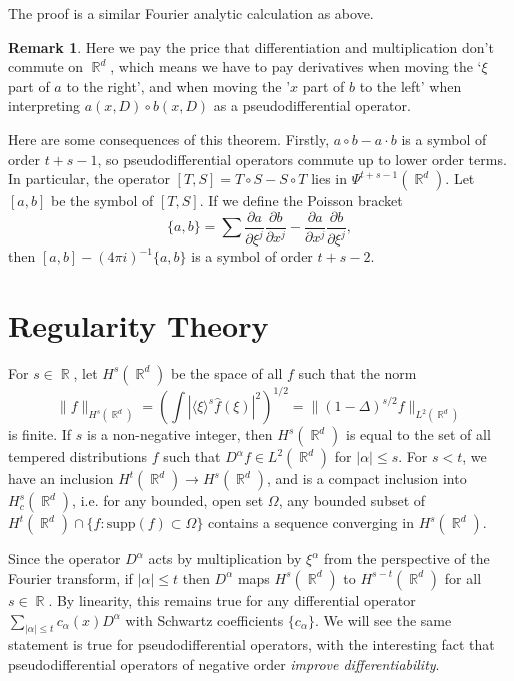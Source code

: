 \documentclass{article}
\DeclareMathOperator{\RR}{\mathbb{R}}
\theoremstyle{plain}
\theoremstyle{definition}
\newtheorem*{remark}{Remark}
\begin{document}
The proof is a similar Fourier analytic calculation as above.

\begin{remark}
    Here we pay the price that differentiation and multiplication don't commute on $\RR^d$, which means we have to pay derivatives when moving the `$\xi$ part of $a$ to the right', and when moving the '$x$ part of $b$ to the left' when interpreting $a(x,D) \circ b(x,D)$ as a pseudodifferential operator.
\end{remark}

Here are some consequences of this theorem. Firstly, $a \circ b - a \cdot b$ is a symbol of order $t + s -1$, so pseudodifferential operators commute up to lower order terms. In particular, the operator $[T,S] = T \circ S - S \circ T$ lies in $\Psi^{t + s - 1}(\RR^d)$. Let $[a,b]$ be the symbol of $[T,S]$. If we define the Poisson bracket
%
\[ \{ a, b \} = \sum \frac{\partial a}{\partial \xi^j} \frac{\partial b}{\partial x^j} - \frac{\partial a}{\partial x^j} \frac{\partial b}{\partial \xi^j}, \]
%
then $[a,b] - (4 \pi i)^{-1} \{ a, b \}$ is a symbol of order $t + s - 2$.

\section{Regularity Theory}

For $s \in \RR$, let $H^s(\RR^d)$ be the space of all $f$ such that the norm
%
\[ \| f \|_{H^s(\RR^d)} = \left( \int | \langle \xi \rangle^s \widehat{f}(\xi)|^2 \right)^{1/2} = \| (1 - \Delta)^{s/2} f \|_{L^2(\RR^d)} \]
%
is finite. If $s$ is a non-negative integer, then $H^s(\RR^d)$ is equal to the set of all tempered distributions $f$ such that $D^\alpha f \in L^2(\RR^d)$ for $|\alpha| \leq s$. For $s < t$, we have an inclusion $H^t(\RR^d) \to H^s(\RR^d)$, and is a compact inclusion into $H^s_c(\RR^d)$, i.e. for any bounded, open set $\Omega$, any bounded subset of $H^t(\RR^d) \cap \{ f : \text{supp}(f) \subset \Omega \}$ contains a sequence converging in $H^s(\RR^d)$.

Since the operator $D^\alpha$ acts by multiplication by $\xi^\alpha$ from the perspective of the Fourier transform, if $|\alpha| \leq t$ then $D^\alpha$ maps $H^s(\RR^d)$ to $H^{s - t}(\RR^d)$ for all $s \in \RR$. By linearity, this remains true for any differential operator $\sum_{|\alpha| \leq t} c_\alpha(x) D^\alpha$ with Schwartz coefficients $\{ c_\alpha \}$. We will see the same statement is true for pseudodifferential operators, with the interesting fact that pseudodifferential operators of negative order \emph{improve differentiability}.
\end{document}
